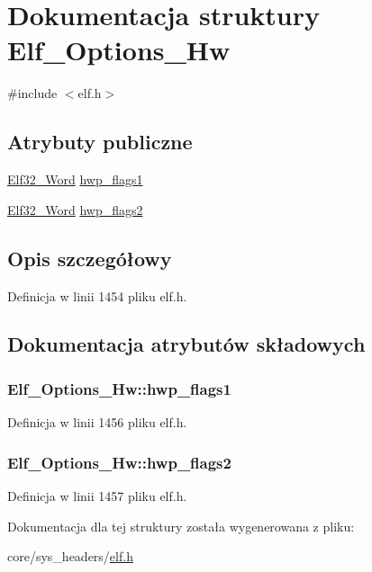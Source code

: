 \hypertarget{struct_elf___options___hw}{\section{Dokumentacja struktury Elf\-\_\-\-Options\-\_\-\-Hw}
\label{struct_elf___options___hw}
}


{\ttfamily \#include $<$elf.\-h$>$}

\subsection*{Atrybuty publiczne}
\begin{DoxyCompactItemize}
\item 
\hyperlink{elf_8h_af5924ece606c732e86f8263a19408e45}{Elf32\-\_\-\-Word} \hyperlink{struct_elf___options___hw_ade844ca291219a4c2ddb9daa5ff7cdc1}{hwp\-\_\-flags1}
\item 
\hyperlink{elf_8h_af5924ece606c732e86f8263a19408e45}{Elf32\-\_\-\-Word} \hyperlink{struct_elf___options___hw_a4940c510ca6158e2ea1df247ffce5882}{hwp\-\_\-flags2}
\end{DoxyCompactItemize}


\subsection{Opis szczegółowy}


Definicja w linii 1454 pliku elf.\-h.



\subsection{Dokumentacja atrybutów składowych}
\hypertarget{struct_elf___options___hw_ade844ca291219a4c2ddb9daa5ff7cdc1}{
\subsubsection[{hwp\-\_\-flags1}]{ Elf\-\_\-\-Options\-\_\-\-Hw\-::hwp\-\_\-flags1}}\label{struct_elf___options___hw_ade844ca291219a4c2ddb9daa5ff7cdc1}


Definicja w linii 1456 pliku elf.\-h.

\hypertarget{struct_elf___options___hw_a4940c510ca6158e2ea1df247ffce5882}{
\subsubsection[{hwp\-\_\-flags2}]{ Elf\-\_\-\-Options\-\_\-\-Hw\-::hwp\-\_\-flags2}}\label{struct_elf___options___hw_a4940c510ca6158e2ea1df247ffce5882}


Definicja w linii 1457 pliku elf.\-h.



Dokumentacja dla tej struktury została wygenerowana z pliku\-:\begin{DoxyCompactItemize}
\item 
core/sys\-\_\-headers/\hyperlink{elf_8h}{elf.\-h}\end{DoxyCompactItemize}

